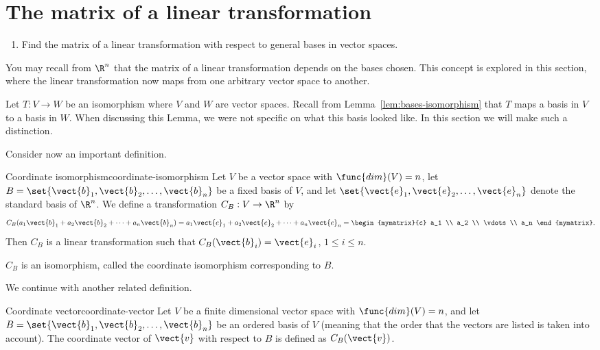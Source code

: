 \section{The matrix of a linear transformation}

\begin{outcome}
  \begin{enumerate}
  \item Find the matrix of a linear transformation with respect to
    general bases in vector spaces.
  \end{enumerate}
\end{outcome}

You may recall from $\R^n$ that the matrix of a linear transformation depends on the bases chosen. This concept is explored in this section, where the linear transformation now maps from one arbitrary vector space to another. 

Let $T: V \to W$ be an isomorphism where $V$ and $W$ are vector spaces. Recall from Lemma~\ref{lem:bases-isomorphism} that $T$ maps a basis in $V$ to a basis in $W$. When discussing this Lemma, we were not specific on what this basis looked like. In this section we will make such a distinction. 

Consider now an important definition.

\begin{definition}{Coordinate isomorphism}{coordinate-isomorphism}
Let $V$ be a vector space with $\func{dim}(V)=n$, let $B=\set{\vect{b}_1, \vect{b}_2, \ldots, \vect{b}_n}$ be a fixed basis of $V$,
and let $\set{\vect{e}_1, \vect{e}_2, \ldots, \vect{e}_n}$
denote the standard basis of $\R^n$.
We define a transformation $C_B:V\to\R^n$ by
\[
C_B(a_1\vect{b}_1 + a_2\vect{b}_2 + \cdots + a_n\vect{b}_n)
=
a_1\vect{e}_1 + a_2\vect{e}_2 + \cdots + a_n\vect{e}_n
=
\begin{mymatrix}{c} a_1 \\ a_2 \\ \vdots \\ a_n
\end{mymatrix}.\]
Then $C_B$ is a linear transformation
such that
$C_B(\vect{b}_i)=\vect{e}_i$, $1\leq i\leq n$.

$C_B$ is an isomorphism, called
the coordinate isomorphism corresponding to $B$.
\end{definition}

We continue with another related definition.

\begin{definition}{Coordinate vector}{coordinate-vector}
Let $V$ be a finite dimensional vector space with $\func{dim}(V)=n$, and
let $B=\set{\vect{b}_1, \vect{b}_2, \ldots, \vect{b}_n}$ be an ordered basis of $V$ (meaning that the order that the
vectors are listed is taken into account).
The coordinate vector of $\vect{v}$ with respect to $B$ is defined
as $C_B(\vect{v})$.
\end{definition}

